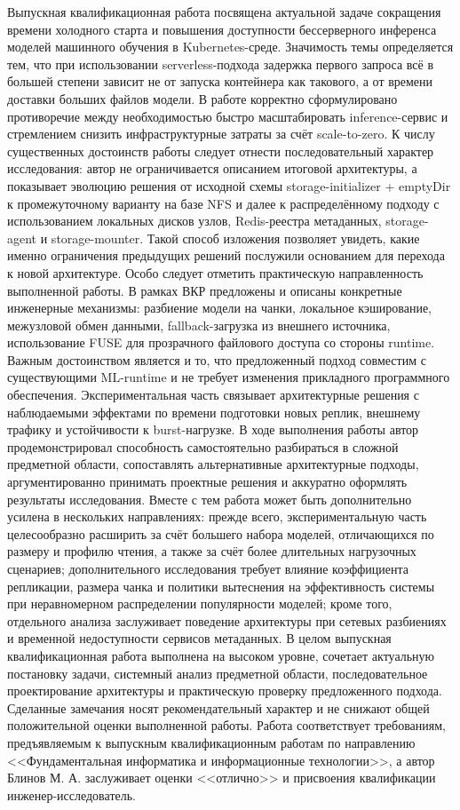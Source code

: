\documentclass[master, fontsize=12pt]{diploma}
\begin{document}
\fillReviewHeader
\par\noindent\makeSimilarityLine\par
\setlength{\parskip}{0pt}
\sloppy

Выпускная квалификационная работа посвящена актуальной задаче сокращения времени холодного старта и повышения доступности бессерверного инференса моделей машинного обучения в Kubernetes-среде. Значимость темы определяется тем, что при использовании serverless-подхода задержка первого запроса всё в большей степени зависит не от запуска контейнера как такового, а от времени доставки больших файлов модели. В работе корректно сформулировано противоречие между необходимостью быстро масштабировать inference-сервис и стремлением снизить инфраструктурные затраты за счёт scale-to-zero. К числу существенных достоинств работы следует отнести последовательный характер исследования: автор не ограничивается описанием итоговой архитектуры, а показывает эволюцию решения от исходной схемы storage-initializer + emptyDir к промежуточному варианту на базе NFS и далее к распределённому подходу с использованием локальных дисков узлов, Redis-реестра метаданных, storage-agent и storage-mounter. Такой способ изложения позволяет увидеть, какие именно ограничения предыдущих решений послужили основанием для перехода к новой архитектуре. Особо следует отметить практическую направленность выполненной работы. В рамках ВКР предложены и описаны конкретные инженерные механизмы: разбиение модели на чанки, локальное кэширование, межузловой обмен данными, fallback-загрузка из внешнего источника, использование FUSE для прозрачного файлового доступа со стороны runtime. Важным достоинством является и то, что предложенный подход совместим с существующими ML-runtime и не требует изменения прикладного программного обеспечения. Экспериментальная часть связывает архитектурные решения с наблюдаемыми эффектами по времени подготовки новых реплик, внешнему трафику и устойчивости к burst-нагрузке. В ходе выполнения работы автор продемонстрировал способность самостоятельно разбираться в сложной предметной области, сопоставлять альтернативные архитектурные подходы, аргументированно принимать проектные решения и аккуратно оформлять результаты исследования. Вместе с тем работа может быть дополнительно усилена в нескольких направлениях: прежде всего, экспериментальную часть целесообразно расширить за счёт большего набора моделей, отличающихся по размеру и профилю чтения, а также за счёт более длительных нагрузочных сценариев; дополнительного исследования требует влияние коэффициента репликации, размера чанка и политики вытеснения на эффективность системы при неравномерном распределении популярности моделей; кроме того, отдельного анализа заслуживает поведение архитектуры при сетевых разбиениях и временной недоступности сервисов метаданных. В целом выпускная квалификационная работа выполнена на высоком уровне, сочетает актуальную постановку задачи, системный анализ предметной области, последовательное проектирование архитектуры и практическую проверку предложенного подхода. Сделанные замечания носят рекомендательный характер и не снижают общей положительной оценки выполненной работы. Работа соответствует требованиям, предъявляемым к выпускным квалификационным работам по направлению <<Фундаментальная информатика и информационные технологии>>, а автор Блинов М. А. заслуживает оценки <<отлично>> и присвоения квалификации инженер-исследователь.

\makeReviewSignature
\end{document}
